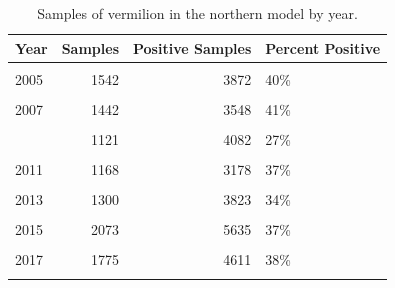 \documentclass[11pt,
  english,
  a4paper,
]{article}
\begin{document}
\begin{table}

\caption{\label{tab:tab-year-crfspr}Samples of vermilion in the northern model by year.}
\centering
\begin{tabular}[t]{lrrl}
\toprule
Year & Samples & Positive Samples & Percent Positive\\
\midrule
\cellcolor{gray!6}{2004} & \cellcolor{gray!6}{1236} & \cellcolor{gray!6}{2833} & \cellcolor{gray!6}{44\%}\\
2005 & 1542 & 3872 & 40\%\\
\cellcolor{gray!6}{2006} & \cellcolor{gray!6}{2109} & \cellcolor{gray!6}{4932} & \cellcolor{gray!6}{43\%}\\
2007 & 1442 & 3548 & 41\%\\
\cellcolor{gray!6}{2008} & \cellcolor{gray!6}{1104} & \cellcolor{gray!6}{3691} & \cellcolor{gray!6}{30\%}\\
\addlinespace
2009 & 1121 & 4082 & 27\%\\
\cellcolor{gray!6}{2010} & \cellcolor{gray!6}{969} & \cellcolor{gray!6}{2682} & \cellcolor{gray!6}{36\%}\\
2011 & 1168 & 3178 & 37\%\\
\cellcolor{gray!6}{2012} & \cellcolor{gray!6}{1023} & \cellcolor{gray!6}{3126} & \cellcolor{gray!6}{33\%}\\
2013 & 1300 & 3823 & 34\%\\
\addlinespace
\cellcolor{gray!6}{2014} & \cellcolor{gray!6}{1434} & \cellcolor{gray!6}{4570} & \cellcolor{gray!6}{31\%}\\
2015 & 2073 & 5635 & 37\%\\
\cellcolor{gray!6}{2016} & \cellcolor{gray!6}{1810} & \cellcolor{gray!6}{4812} & \cellcolor{gray!6}{38\%}\\
2017 & 1775 & 4611 & 38\%\\
\cellcolor{gray!6}{2018} & \cellcolor{gray!6}{1865} & \cellcolor{gray!6}{4442} & \cellcolor{gray!6}{42\%}\\
\bottomrule
\end{tabular}
\end{table}

\FloatBarrier
\end{document}
